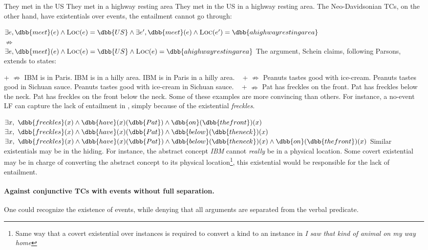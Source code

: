 \pex
\a They met in the US
\a They met in a highway resting area
\a They met in the US in a highway resting area.
\xe
%
The Neo-Davidsonian TCs, on the other hand, have existentials over events, the entailment cannot go through:

\ex
$\exists e, \dbb{meet}(e) \wedge \textsc{Loc}(e) = \dbb{US} \wedge \exists e', \dbb{meet}(e) \wedge \textsc{Loc}(e') = \dbb{a highway resting area}$\\
$\nRightarrow$\\
$\exists e, \dbb{meet}(e) \wedge \textsc{Loc}(e) = \dbb{US} \wedge  \textsc{Loc}(e) = \dbb{a highway resting area}$
\xe
%
The argument, Schein claims, following Parsons, extends to states:

\pex \clastx[a] + \clastx[b] $\nRightarrow$ \clastx[c]
\a IBM is in Paris.
\a IBM is in a hilly area.
\a IBM is in Paris in a hilly area.
\xe
%
\pex~ \clastx[a] + \clastx[b] $\nRightarrow$ \clastx[c]
\a Peanuts tastes good with ice-cream.
\a Peanuts tastes good in Sichuan sauce.
\a Peanuts tastes good with ice-cream in Sichuan sauce.
\xe
%
\pex~ \clastx[a] + \clastx[b] $\nRightarrow$ \clastx[c]
\a Pat has freckles on the front.
\a Pat has freckles below the neck.
\a Pat has freckles on the front below the neck.
\xe
%
Some of these examples are more convincing than others. For instance, a no-event LF can capture the lack of entailment in \clastx, simply because of the existential \emph{freckles}.

\pex
\a $\exists x,\ \dbb{freckles}(x) \wedge \dbb{have}(x)(\dbb{Pat})\wedge \dbb{on}(\dbb{the front})(x)$
\a $\exists x,\ \dbb{freckles}(x) \wedge \dbb{have}(x)(\dbb{Pat})\wedge \dbb{below}(\dbb{the neck})(x)$
\a $\exists x,\ \dbb{freckles}(x) \wedge \dbb{have}(x)(\dbb{Pat})\wedge \dbb{below}(\dbb{the neck})(x)
\wedge \dbb{on}(\dbb{the front})(x)
$
\xe
%
Similar existentials may be in the hiding. For instance, the abstract concept \emph{IBM} cannot \emph{really} be in a physical location. Some covert existential may be in charge of converting the abstract concept to its physical location\footnote{Same way that a covert existential over instances is required to convert a kind to an instance in \emph{I saw that kind of animal on my way home}}, this existential would be responsible for the lack of entailment.

\paragraph{Against conjunctive TCs with events without full separation.} One could recognize the existence of events, while denying that all arguments are separated from the verbal predicate.

